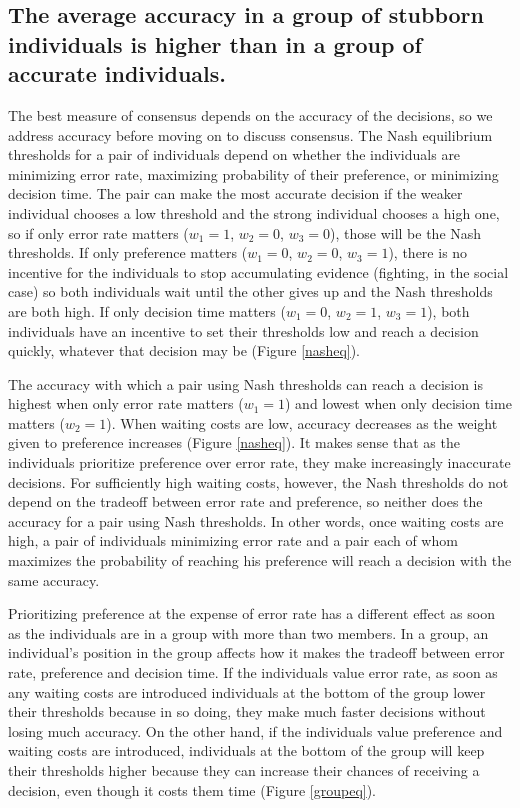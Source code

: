 \documentclass{article}
\begin{document}
\subsection{The average accuracy in a group of stubborn individuals is higher than in a group of accurate individuals. }
The best measure of consensus depends on the accuracy of the decisions, so we address accuracy before moving on to discuss consensus. The Nash equilibrium thresholds for a pair of individuals depend on whether the individuals are minimizing error rate, maximizing probability of their preference, or minimizing decision time.  The pair can make the most accurate decision if the weaker individual chooses a low threshold and the strong individual chooses a high one, so if only error rate matters ($w_1=1$, $w_2=0$, $w_3=0$), those will be the Nash  thresholds.   If only preference matters ($w_1=0$, $w_2=0$, $w_3=1$), there is no incentive for the individuals to stop accumulating evidence (fighting, in the social case) so both individuals wait until the other gives up and the Nash  thresholds are both high.  If only decision time matters ($w_1=0$, $w_2=1$, $w_3=1$), both individuals have an incentive to set their thresholds low and reach a decision quickly, whatever that decision may be (Figure \ref{nasheq}).   

The accuracy with which a pair using Nash thresholds can reach a decision is highest when only error rate matters ($w_1=1$) and lowest when only decision time matters ($w_2=1$).  When waiting costs are low, accuracy decreases as the weight given to preference increases (Figure \ref{nasheq}).  It makes sense that as the individuals prioritize preference over error rate, they make increasingly inaccurate decisions.  For sufficiently high waiting costs, however, the Nash thresholds do not depend on the tradeoff between error rate and preference, so neither does the accuracy for a pair using Nash thresholds.  In other words, once waiting costs are high, a pair of individuals minimizing error rate and a pair each of whom maximizes the probability of reaching his preference will reach a decision with the same accuracy.

Prioritizing preference at the expense of error rate has a different effect as soon as the individuals are in a group with more than two members.  In a group, an individual's position in the group affects how it makes the tradeoff between error rate, preference and decision time.  If the individuals value error rate, as soon as any waiting costs are introduced individuals at the bottom of the group lower their thresholds because in so doing, they make much faster decisions without losing much accuracy.  On the other hand, if the individuals value preference and waiting costs are introduced, individuals at the bottom of the group will keep their thresholds higher because they can increase their chances of receiving a decision, even though it costs them time (Figure \ref{groupeq}).  
\end{document}
